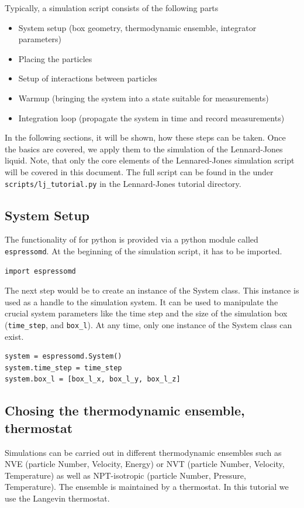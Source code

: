 \documentclass[
paper=a4,                       %
fontsize=11pt,                  %
twoside,                        %
footsepline,                    %
headsepline,                    %
headinclude=false,              %
footinclude=false,              %
pagesize,                       %
]{scrartcl}
\begin{document}
Typically, a simulation script consists of the following parts
\begin{itemize}
\item System setup (box geometry, thermodynamic ensemble, integrator parameters)
\item Placing the particles
\item Setup of interactions between particles
\item Warmup (bringing the system into a state suitable for measurements)
\item Integration loop (propagate the system in time and record measurements)
\end{itemize}
In the following sections, it will be shown, how these steps can be taken. Once the basics are covered, we apply them to the simulation of the Lennard-Jones liquid.
Note, that only the core elements of the Lennared-Jones simulation script will be covered in this document. The full script can be found in the under \verb+scripts/lj_tutorial.py+ in the Lennard-Jones tutorial directory.


\subsection{System Setup}
The functionality of \es{} for
python is provided via a python module called
\texttt{espressomd}. At the beginning of the simulation script, it has to be imported.
\begin{lstlisting}
import espressomd
\end{lstlisting}

The next step would be to create an instance of the System class. 
This instance is used as a handle to the simulation system. It can be used to manipulate the
crucial system parameters like the time step and the size of the simulation box (\texttt{time\_step}, and \texttt{box\_l}). At any time, only one instance of the System class can exist.
\begin{lstlisting}
system = espressomd.System()
system.time_step = time_step
system.box_l = [box_l_x, box_l_y, box_l_z]
\end{lstlisting}
\subsection{Chosing the thermodynamic ensemble, thermostat}
Simulations can be carried out in different thermodynamic ensembles such as NVE (particle
Number, Velocity, Energy) or NVT (particle Number, Velocity, Temperature)
as well as NPT-isotropic (particle Number, Pressure, Temperature). 
The ensemble is maintained by a thermostat. In this tutorial we use the Langevin thermostat.
\end{document}
